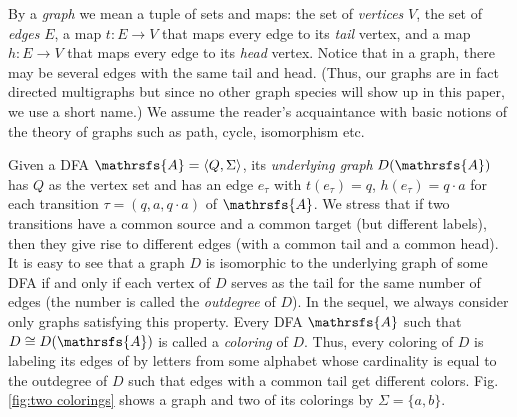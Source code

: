 \documentclass[11pt]{llncs}
\begin{document}
By a \emph{graph} we mean a tuple of sets and maps: the set of \emph{vertices}
$V$, the set of \emph{edges} $E$, a map $t: E\to V$ that maps every edge to its
\emph{tail} vertex, and a map $h:E\to V$ that maps every edge to its
\emph{head} vertex. Notice that in a graph, there may be several edges with the
same tail and head. (Thus, our graphs are in fact directed multigraphs but
since no other graph species will show up in this paper, we use a short name.)
We assume the reader's acquaintance with basic notions of the theory of graphs
such as path, cycle, isomorphism etc.

Given a DFA $\mathrsfs{A}=\langle Q,\Sigma\rangle$, its \emph{underlying graph}
$D(\mathrsfs{A})$ has $Q$ as the vertex set and has an edge $e_\tau$ with
$t(e_\tau)=q$, $h(e_\tau)=q\cdot a$ for each transition $\tau=(q,a,q\cdot a)$
of $\mathrsfs{A}$. We stress that if two transitions have a common source and a
common target (but different labels), then they give rise to different edges
(with a common tail and a common head). It is easy to see that a graph $D$ is
isomorphic to the underlying graph of some DFA if and only if each vertex of
$D$ serves as the tail for the same number of edges (the number is called the
\emph{outdegree} of $D$). In the sequel, we always consider only graphs
satisfying this property. Every DFA $\mathrsfs{A}$ such that $D\cong
D(\mathrsfs{A})$ is called a \emph{coloring} of $D$. Thus, every coloring of
$D$ is labeling its edges of by letters from some alphabet whose cardinality is
equal to the outdegree of $D$ such that edges with a common tail get different
colors. Fig.\,\ref{fig:two colorings} shows a graph and two of its colorings by
$\Sigma=\{a,b\}$.
\end{document}
